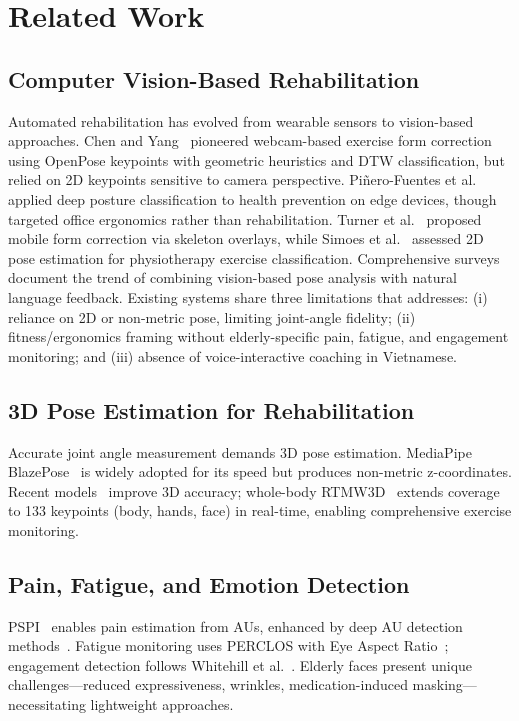 \section{Related Work}
\label{sec:related}

\subsection{Computer Vision-Based Rehabilitation}
Automated rehabilitation has evolved from wearable sensors to vision-based approaches. Chen and Yang~\cite{chen2020pose} pioneered webcam-based exercise form correction using OpenPose keypoints with geometric heuristics and DTW classification, but relied on 2D keypoints sensitive to camera perspective. Pi{\~n}ero-Fuentes et al.~\cite{pinero2021deep} applied deep posture classification to health prevention on edge devices, though targeted office ergonomics rather than rehabilitation. Turner et al.~\cite{appiah2024mobile} proposed mobile form correction via skeleton overlays, while Simoes et al.~\cite{simoes2024accuracy} assessed 2D pose estimation for physiotherapy exercise classification. Comprehensive surveys~\cite{lan2023vision} document the trend of combining vision-based pose analysis with natural language feedback. Existing systems share three limitations that \system{} addresses: (i) reliance on 2D or non-metric pose, limiting joint-angle fidelity; (ii) fitness/ergonomics framing without elderly-specific pain, fatigue, and engagement monitoring; and (iii) absence of voice-interactive coaching in Vietnamese.

\subsection{3D Pose Estimation for Rehabilitation}
Accurate joint angle measurement demands 3D pose estimation. MediaPipe BlazePose~\cite{bazarevsky2020blazepose} is widely adopted for its speed but produces non-metric z-coordinates. Recent models~\cite{zhu2023motionbert,mehraban2024motionagformer,sarandi2020metrabs} improve 3D accuracy; whole-body RTMW3D~\cite{jiang2024rtmw} extends coverage to 133 keypoints (body, hands, face) in real-time, enabling comprehensive exercise monitoring.

\subsection{Pain, Fatigue, and Emotion Detection}
PSPI~\cite{prkachin2008structure} enables pain estimation from AUs, enhanced by deep AU detection methods~\cite{shao2021jaa,wang2025graphau}. Fatigue monitoring uses PERCLOS with Eye Aspect Ratio~\cite{dewi2022adjusting}; engagement detection follows Whitehill et al.~\cite{6786307}. Elderly faces present unique challenges---reduced expressiveness, wrinkles, medication-induced masking---necessitating lightweight approaches.

